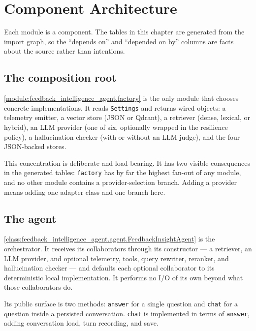 
\chapter{Component Architecture}
\label{ch:components}

Each module is a component. The tables in this chapter are generated from the
import graph, so the ``depends on'' and ``depended on by'' columns are facts
about the source rather than intentions.

\section{The composition root}

\cref{module:feedback_intelligence_agent.factory} is the only module that
chooses concrete implementations. It reads \texttt{Settings} and returns wired
objects: a telemetry emitter, a vector store (JSON or Qdrant), a retriever
(dense, lexical, or hybrid), an LLM provider (one of six, optionally wrapped in
the resilience policy), a hallucination checker (with or without an LLM judge),
and the four JSON-backed stores.

This concentration is deliberate and load-bearing. It has two visible
consequences in the generated tables: \texttt{factory} has by far the highest
fan-out of any module, and no other module contains a provider-selection
branch. Adding a provider means adding one adapter class and one branch here.

\section{The agent}

\cref{class:feedback_intelligence_agent.agent.FeedbackInsightAgent} is the
orchestrator. It receives its collaborators through its constructor --- a
retriever, an LLM provider, and optional telemetry, tools, query rewriter,
reranker, and hallucination checker --- and defaults each optional
collaborator to its deterministic local implementation. It performs no I/O of
its own beyond what those collaborators do.

Its public surface is two methods: \texttt{answer} for a single question and
\texttt{chat} for a question inside a persisted conversation. \texttt{chat} is
implemented in terms of \texttt{answer}, adding conversation load, turn
recording, and save.

